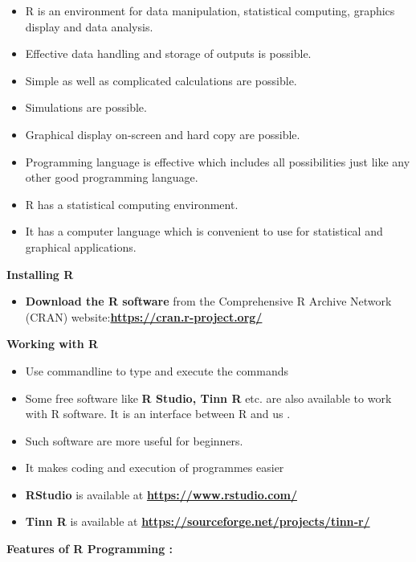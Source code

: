 \documentclass[
]{article}
\providecommand{\tightlist}{%
  \setlength{\itemsep}{0pt}\setlength{\parskip}{0pt}}
\begin{document}
\begin{itemize}
\item
  R is an environment for data manipulation, statistical computing,
  graphics display and data analysis.
\item
  Effective data handling and storage of outputs is possible.
\item
  Simple as well as complicated calculations are possible.
\item
  Simulations are possible.
\item
  Graphical display on‐screen and hard copy are possible.
\item
  Programming language is effective which includes all possibilities
  just like any other good programming language.
\item
  R has a statistical computing environment.
\item
  It has a computer language which is convenient to use for statistical
  and graphical applications.
\end{itemize}

\textbf{Installing R}

\begin{itemize}
\tightlist
\item
  \textbf{Download the R software} from the Comprehensive R Archive
  Network (CRAN)
  website:\href{https://cran.r-project.org/}{\textbf{https://cran.r-project.org/}}
\end{itemize}

\textbf{Working with R}

\begin{itemize}
\item
  Use commandline to type and execute the commands
\item
  Some free software like \textbf{R Studio, Tinn R} etc. are also
  available to work with R software. It is an interface between R and us
  .
\item
  Such software are more useful for beginners.
\item
  It makes coding and execution of programmes easier
\item
  \textbf{RStudio} is available at
  \href{https://www.rstudio.com/}{\textbf{https://www.rstudio.com/}}
\item
  \textbf{Tinn R} is available at
  \href{https://sourceforge.net/projects/tinn‐r/}{\textbf{https://sourceforge.net/projects/tinn‐r/}}
\end{itemize}

\textbf{Features of R Programming :}
\end{document}
